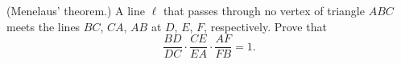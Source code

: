 (Menelaus' theorem.) A line $\ell$ that passes through no vertex of triangle $ABC$ meets the lines $BC$, $CA$, $AB$ at $D$, $E$, $F$, respectively. Prove that
\[
\dfrac{BD}{DC}\cdot\dfrac{CE}{EA}\cdot\dfrac{AF}{FB}=1 .
\]
